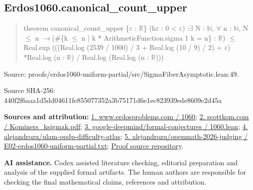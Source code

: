 \documentclass[11pt,a4paper]{article}
\begin{document}
\begin{samepage}
\subsection{Erdos1060.canonical\_count\_upper}
\begin{quote}\small\ttfamily theorem canonical\_count\_upper \{\ensuremath{\varepsilon} : \ensuremath{\mathbb{R}}\} (h\ensuremath{\varepsilon} : 0 < \ensuremath{\varepsilon}) :\newline     \ensuremath{\exists} N : \ensuremath{\mathbb{N}}, \ensuremath{\forall} n : \ensuremath{\mathbb{N}}, N \ensuremath{\leq} n \ensuremath{\to}\newline       (\#\{k \ensuremath{\leq} n | k * ArithmeticFunction.sigma 1 k = n\} : \ensuremath{\mathbb{R}}) \ensuremath{\leq}\newline         Real.exp (((Real.log (2539 / 1000) / 3 + Real.log (10 / 9) / 2) + \ensuremath{\varepsilon}) *\newline           Real.log (n : \ensuremath{\mathbb{R}}) / Real.log (Real.log (n : \ensuremath{\mathbb{R}})))\end{quote}
{\small Source: proofs/erdos1060-uniform-partial/src/SigmaFiberAsymptotic.lean:49.\par}

{\small Source SHA-256: 440f2f6aaa1d5dd04611fe855077352a3b75171d6e1ec823939ede8609e2d45a\par}

{\small\textbf{Sources and attribution:} \href{https://www.erdosproblems.com/1060}{1. www.erdosproblems.com / 1060}; \href{https://scottkom.com/assets/articles/Kominers_ksigmak.pdf}{2. scottkom.com / Kominers\_ksigmak.pdf}; \href{https://github.com/google-deepmind/formal-conjectures/blob/main/FormalConjectures/ErdosProblems/1060.lean}{3. google-deepmind/formal-conjectures / 1060.lean}; \href{https://github.com/alejandrozu/ulam-opdp-difficulty-atlas}{4. alejandrozu/ulam-opdp-difficulty-atlas}; \href{https://github.com/alejandrozu/openmath-2026-judging/blob/d0ed487f487fa7ec814ff705ab55249983fe8707/OpenMath-Judging/review/entries/E02-erdos1060-uniform-partial.txt}{5. alejandrozu/openmath-2026-judging / E02-erdos1060-uniform-partial.txt}; \href{https://github.com/alejandrozu/openmath-2026-judging}{Proof source repository}.\par}

\end{samepage}
{\small \textbf{AI assistance.} Codex assisted literature checking, editorial preparation and analysis of the supplied formal artifacts. The human authors are responsible for checking the final mathematical claims, references and attribution.\par}
\end{document}
